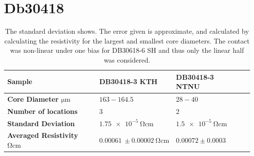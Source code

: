\section{Db30418}
\begin{table}[!h]
\begin{center}
\begin{tabular}{ | l | l | l | l |}
\hline
\textbf{Sample}& DB30418-3 KTH & DB30418-3 NTNU \\ \hline
\textbf{Core Diameter $\si{\micro \meter}$}& $ 163-164.5$ & $28-40$ \\\hline
\textbf{Number of locations}&$3$&$2$ \\\hline
\textbf{Standard Deviation}& $\SI{1.75e-5}{\ohm \cm}$ & $ \SI{1.5e-5}{\ohm\cm}$ \\\hline
\textbf{Averaged Resistivity $\si{\ohm \cm}$}& $\SI{0.00061}{}\pm\SI{ 0.00002}{\ohm \cm}$ &$0.00072 \pm 0.0003 $ \\\hline
\end{tabular}
\end{center}
\caption{The standard deviation shows. The error given is approximate, and calculated by calculating the resistivity for the largest and smallest core diameters. The contact was non-linear under one bias for DB30618-6 SH and thus only the linear half was considered. }
\label{Tabmb25}
\end{table}





